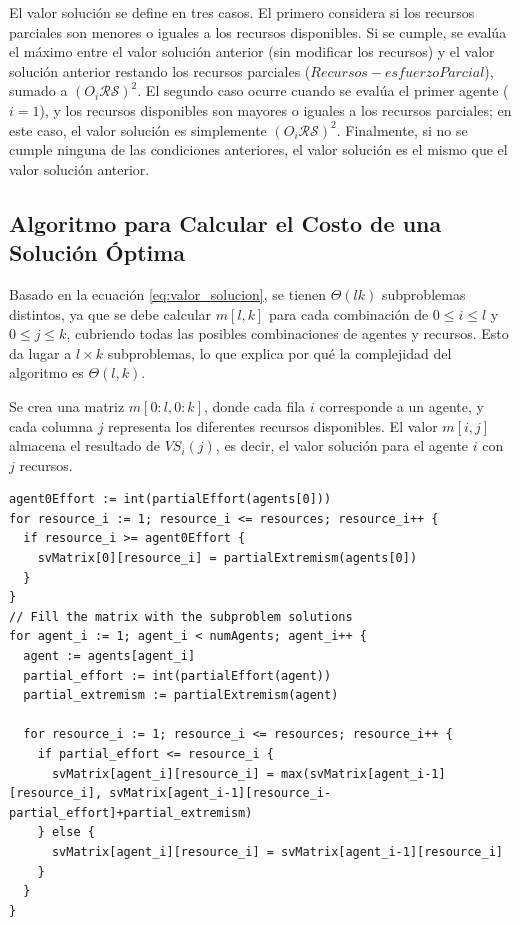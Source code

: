 \documentclass[letterpaper,10pt]{article}
\begin{document}
El valor solución se define en tres casos. El primero considera si los recursos parciales son menores o iguales a los recursos disponibles. Si se cumple, se evalúa el máximo entre el valor solución anterior (sin modificar los recursos) y el valor solución anterior restando los recursos parciales (\(Recursos - esfuerzoParcial\)), sumado a \((O_i\mathcal{R}\mathcal{S})^2\). El segundo caso ocurre cuando se evalúa el primer agente (\(i=1\)), y los recursos disponibles son mayores o iguales a los recursos parciales; en este caso, el valor solución es simplemente \((O_i\mathcal{R}\mathcal{S})^2\). Finalmente, si no se cumple ninguna de las condiciones anteriores, el valor solución es el mismo que el valor solución anterior.

\subsection{Algoritmo para Calcular el Costo de una Solución Óptima}
\label{subsec:algoritmo_costo_solucion_optima}
Basado en la ecuación \eqref{eq:valor_solucion}, se tienen \(\Theta(lk)\) subproblemas distintos, ya que se debe calcular \(m[l, k]\) para cada combinación de \(0 \leq i \leq l\) y \(0 \leq j \leq k\), cubriendo todas las posibles combinaciones de agentes y recursos. Esto da lugar a \(l \times k\) subproblemas, lo que explica por qué la complejidad del algoritmo es \(\Theta(l, k)\). 

Se crea una matriz \(m[0:l, 0:k]\), donde cada fila \(i\) corresponde a un agente, y cada columna \(j\) representa los diferentes recursos disponibles. El valor \(m[i,j]\) almacena el resultado de \(VS_i(j)\), es decir, el valor solución para el agente \(i\) con \(j\) recursos.

\begin{lstlisting}[caption={matrix $m$ $\rightarrow$Extracción del algoritmo ModexPD}, label={lst:modexpd_extraccion}]
agent0Effort := int(partialEffort(agents[0]))
for resource_i := 1; resource_i <= resources; resource_i++ {
  if resource_i >= agent0Effort {
    svMatrix[0][resource_i] = partialExtremism(agents[0])
  }
}
// Fill the matrix with the subproblem solutions
for agent_i := 1; agent_i < numAgents; agent_i++ {
  agent := agents[agent_i]
  partial_effort := int(partialEffort(agent))
  partial_extremism := partialExtremism(agent)

  for resource_i := 1; resource_i <= resources; resource_i++ {
    if partial_effort <= resource_i {
      svMatrix[agent_i][resource_i] = max(svMatrix[agent_i-1][resource_i], svMatrix[agent_i-1][resource_i-partial_effort]+partial_extremism)
    } else {
      svMatrix[agent_i][resource_i] = svMatrix[agent_i-1][resource_i]
    }
  }
}
\end{lstlisting}
\end{document}
